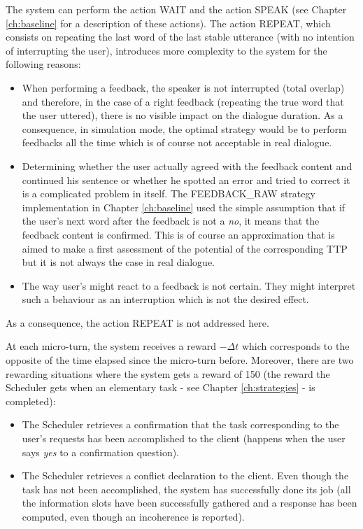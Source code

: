     	The system can perform the action WAIT and the action SPEAK (see Chapter \ref{ch:baseline} for a description of these actions). The action REPEAT, which consists on repeating the last word of the last stable utterance (with no intention of interrupting the user), introduces more complexity to the system for the following reasons:
			
			\begin{itemize}
				\item When performing a feedback, the speaker is not interrupted (total overlap) and therefore, in the case of a right feedback (repeating the true word that the user uttered), there is no visible impact on the dialogue duration. As a consequence, in simulation mode, the optimal strategy would be to perform feedbacks all the time which is of course not acceptable in real dialogue.
				\item Determining whether the user actually agreed with the feedback content and continued his sentence or whether he spotted an error and tried to correct it is a complicated problem in itself. The FEEDBACK\_RAW strategy implementation in Chapter \ref{ch:baseline} used the simple assumption that if the user's next word after the feedback is not a \textit{no}, it means that the feedback content is confirmed. This is of course an approximation that is aimed to make a first assessment of the potential of the corresponding TTP but it is not always the case in real dialogue.
				\item The way user's might react to a feedback is not certain. They might interpret such a behaviour as an interruption which is not the desired effect.
			\end{itemize}
			
			As a consequence, the action REPEAT is not addressed here.
        
    	At each micro-turn, the system receives a reward $-\Delta t$ which corresponds to the opposite of the time elapsed since the micro-turn before. Moreover, there are two rewarding situations where the system gets a reward of 150 (the reward the Scheduler gets when an elementary task - see Chapter \ref{ch:strategies} - is completed):
        
        \begin{itemize}
        	\item The Scheduler retrieves a confirmation that the task corresponding to the user's requests has been accomplished to the client (happens when the user says \textit{yes} to a confirmation question).
            \item The Scheduler retrieves a conflict declaration to the client. Even though the task has not been accomplished, the system has successfully done its job (all the information slots have been successfully gathered and a response has been computed, even though an incoherence is reported).
        \end{itemize}
        
